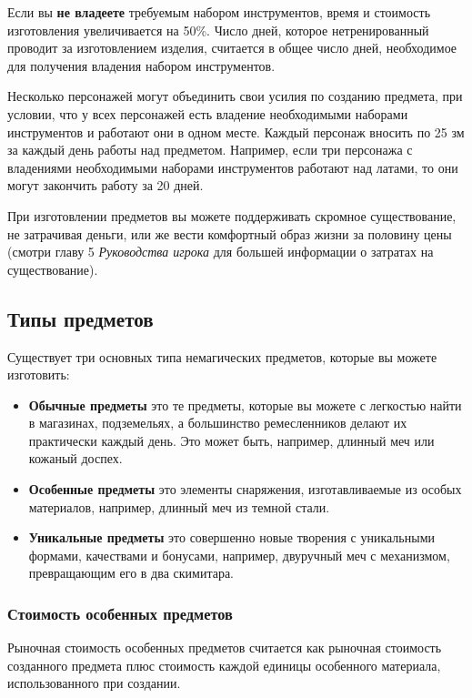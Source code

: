 \documentclass[a4paper, 9pt, twocolumn]{book}
\begin{document}
	Если вы \textbf{не владеете} требуемым набором инструментов, время и стоимость изготовления увеличивается на 50\%. Число дней, которое нетренированный проводит за изготовлением изделия, считается в общее число дней, необходимое для получения владения набором инструментов.
	
	Несколько персонажей могут объединить свои усилия по созданию предмета, при условии, что у всех персонажей есть владение необходимыми наборами инструментов и работают они в одном месте. Каждый персонаж вносить по 25 зм за каждый день работы над предметом. Например, если три персонажа с владениями необходимыми наборами инструментов работают над латами, то они могут закончить работу за 20 дней.
	
	При изготовлении предметов вы можете поддерживать скромное существование, не затрачивая деньги, или же вести комфортный образ жизни за половину цены (смотри главу 5 \textit{Руководства игрока} для большей информации о затратах на существование).
	
	\subsection{Типы предметов}
	
	Существует три основных типа немагических предметов, которые вы можете изготовить:
	
	\begin{itemize}
		\item \textbf{Обычные предметы} это те предметы, которые вы можете с легкостью найти в магазинах, подземельях, а большинство ремесленников делают их практически каждый день. Это может быть, например, длинный меч или кожаный доспех.
		
		\item \textbf{Особенные предметы} это элементы снаряжения, изготавливаемые из особых материалов, например, длинный меч из темной стали.
		
		\item \textbf{Уникальные предметы} это совершенно новые творения с уникальными формами, качествами и бонусами, например, двуручный меч с механизмом, превращающим его в два скимитара.
	\end{itemize}

	\subsubsection{Стоимость особенных предметов}
	
	Рыночная стоимость особенных предметов считается как рыночная стоимость созданного предмета плюс стоимость  каждой единицы особенного материала, использованного при создании.
	
\end{document}
